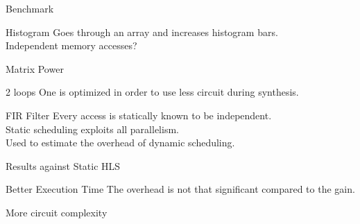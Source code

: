 \documentclass[page number]{beamer}
\begin{document}
\begin{frame}{Benchmark}
  \begin{block}{Histogram}
    Goes through an array and increases histogram bars.\\ Independent memory accesses?
  \end{block}
  \vfill
  \begin{block}{Matrix Power}
  \end{block}
  \vfill
  \begin{block}{2 loops}
    One is optimized in order to use less circuit during synthesis.
  \end{block}
  \vfill
  \begin{alertblock}{FIR Filter}
    Every access is statically known to be independent.\\
    Static scheduling exploits all parallelism.\\
    Used to estimate the overhead of dynamic scheduling.
  \end{alertblock}
\end{frame}

\begin{frame}{Results against Static HLS}
  \tiny
  \hspace*{-8pt}
  \vfill
  \normalsize
  \begin{exampleblock}{Better Execution Time}
    The overhead is not that significant compared to the gain.
  \end{exampleblock}
  \vfill
  \begin{alertblock}{More circuit complexity}
  \end{alertblock}
    
\end{frame}
\end{document}
